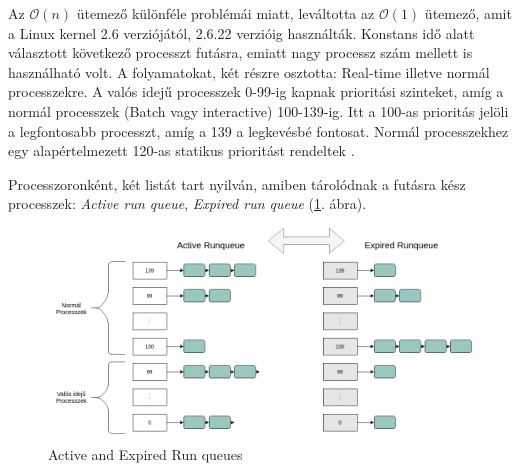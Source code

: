 
Az $\mathcal{O}(n)$ ütemező különféle problémái miatt, leváltotta az $\mathcal{O}(1)$ ütemező, amit a Linux kernel 2.6 verziójától, 2.6.22 verzióig használták. 
Konstans idő alatt választott következő processzt futásra, emiatt nagy processz szám mellett is használható volt.
A folyamatokat, két részre osztotta: Real-time illetve normál processzekre. A valós idejű processzek 0-99-ig kapnak prioritási szinteket, amíg a normál processzek (Batch vagy interactive) 100-139-ig. Itt a 100-as prioritás jelöli a legfontosabb processzt, amíg a 139 a legkevésbé fontosat. Normál processzekhez egy alapértelmezett 120-as statikus prioritást rendeltek \cite{wong2008fairness, rebeiro2020scheduling}.

Processzoronként, két listát tart nyilván, amiben tárolódnak a futásra kész processzek: \textit{Active run queue}, \textit{Expired run queue} (\ref{fig:activeExpiredRunqueue}. ábra).

\begin{figure}[h]
\centering
\includegraphics[width=\textwidth]{images/activeExpiredRunqueue.png}
\caption{Active and Expired Run queues}
\label{fig:activeExpiredRunqueue}
\end{figure}

